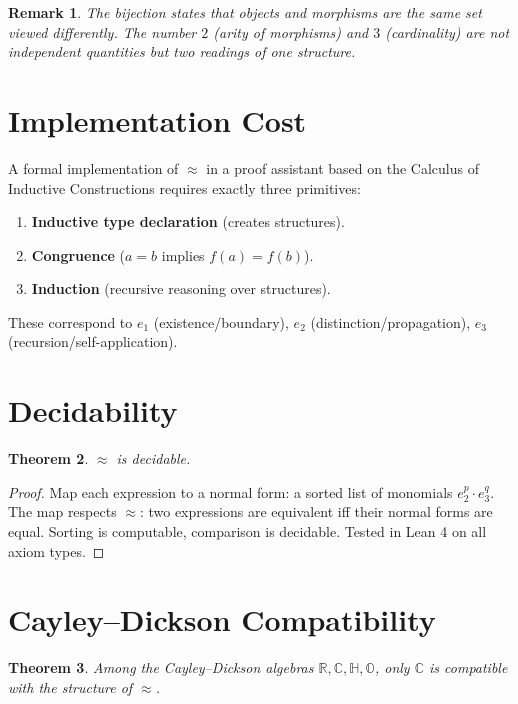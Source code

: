 \documentclass[12pt]{article}
\newtheorem{theorem}{Theorem}
\newtheorem{remark}[theorem]{Remark}
\begin{document}
\begin{remark}
The bijection states that objects and morphisms
are the same set viewed differently.
The number $2$ (arity of morphisms) and $3$
(cardinality) are not independent quantities
but two readings of one structure.
\end{remark}

\section{Implementation Cost}

A formal implementation of $\approx$ in a proof
assistant based on the Calculus of Inductive
Constructions requires exactly three primitives:
\begin{enumerate}
\item \textbf{Inductive type declaration}
  (creates structures).
\item \textbf{Congruence}
  ($a = b$ implies $f(a) = f(b)$).
\item \textbf{Induction}
  (recursive reasoning over structures).
\end{enumerate}
These correspond to $e_1$ (existence/boundary),
$e_2$ (distinction/propagation),
$e_3$ (recursion/self-application).

\section{Decidability}

\begin{theorem}
\label{thm:decide}
$\approx$ is decidable.
\end{theorem}

\begin{proof}
Map each expression to a normal form:
a sorted list of monomials $e_2^p \cdot e_3^q$.
The map respects $\approx$: two expressions are
equivalent iff their normal forms are equal.
Sorting is computable, comparison is decidable.
Tested in Lean 4 on all axiom types.
\end{proof}

\section{Cayley--Dickson Compatibility}

\begin{theorem}
\label{thm:cayley}
Among the Cayley--Dickson algebras
$\mathbb{R}, \mathbb{C}, \mathbb{H}, \mathbb{O}$,
only $\mathbb{C}$ is compatible with the
structure of $\approx$.
\end{theorem}
\end{document}
